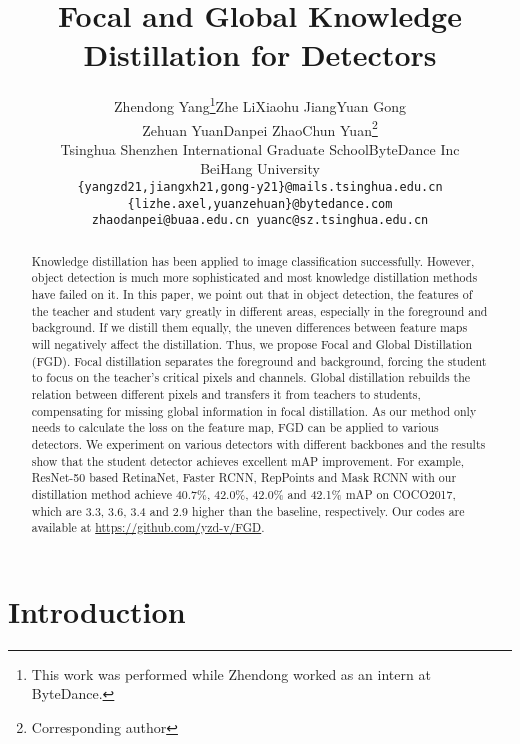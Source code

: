 \documentclass[10pt,twocolumn,letterpaper]{article}
\begin{document}
\title{Focal and Global Knowledge Distillation for Detectors}

\author{Zhendong Yang\thanks{This work was performed while Zhendong worked as an intern at ByteDance.}\quad Zhe Li\quad Xiaohu Jiang\quad Yuan Gong\\ \quad Zehuan Yuan\quad  Danpei Zhao\quad Chun Yuan\thanks{Corresponding author}\\
Tsinghua Shenzhen International Graduate School\quad ByteDance Inc\\BeiHang University\\
{\tt\small \{yangzd21,jiangxh21,gong-y21\}@mails.tsinghua.edu.cn \quad \{lizhe.axel,yuanzehuan\}@bytedance.com}\\
{\tt\small zhaodanpei@buaa.edu.cn \quad yuanc@sz.tsinghua.edu.cn}
}
\maketitle

\begin{abstract}
  Knowledge distillation has been applied to image classification successfully. However, object detection is much more sophisticated and most knowledge distillation methods have failed on it. In this paper, we point out that in object detection, the features of the teacher and student vary greatly in different areas, especially in the foreground and background. If we distill them equally, the uneven differences between feature maps will negatively affect the distillation. Thus, we propose Focal and Global Distillation (FGD). Focal distillation separates the foreground and background, forcing the student to focus on the teacher's critical pixels and channels. Global distillation rebuilds the relation between different pixels and transfers it from teachers to students, compensating for missing global information in focal distillation. As our method only needs to calculate the loss on the feature map, FGD can be applied to various detectors. We experiment on various detectors with different backbones and the results show that the student detector achieves excellent mAP improvement. For example, ResNet-50 based RetinaNet, Faster RCNN, RepPoints and Mask RCNN with our distillation method achieve 40.7\%, 42.0\%, 42.0\% and 42.1\% mAP on COCO2017, which are 3.3, 3.6, 3.4 and 2.9 higher than the baseline, respectively. Our codes are available at \url{https://github.com/yzd-v/FGD}.
\end{abstract}

\section{Introduction}
\label{sec:intro}
\end{document}
